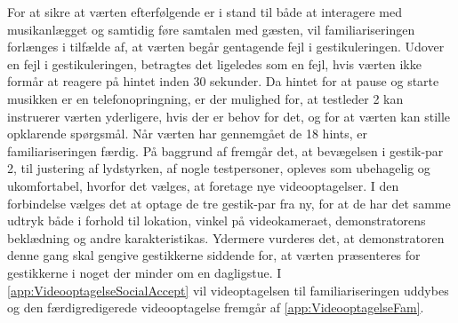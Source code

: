 For at sikre at værten efterfølgende er i stand til både at interagere med musikanlægget og samtidig føre samtalen med gæsten, vil familiariseringen forlænges i tilfælde af, at værten begår gentagende fejl i gestikuleringen. Udover en fejl i gestikuleringen, betragtes det ligeledes som en fejl, hvis værten ikke formår at reagere på hintet inden 30 sekunder. Da hintet for at pause og starte musikken er en telefonopringning, er der mulighed for, at testleder 2 kan instruerer værten yderligere, hvis der er behov for det, og for at værten kan stille opklarende spørgsmål. Når værten har gennemgået de 18 hints, er familiariseringen færdig.\blankline
%
På baggrund af  fremgår det, at bevægelsen i gestik-par 2, til justering af lydstyrken, af nogle testpersoner, opleves som ubehagelig og ukomfortabel, hvorfor det vælges, at foretage nye videooptagelser. I den forbindelse vælges det at optage de tre gestik-par fra ny, for at de har det samme udtryk både i forhold til lokation, vinkel på videokameraet, demonstratorens beklædning og andre karakteristikas. Ydermere vurderes det, at demonstratoren denne gang skal gengive gestikkerne siddende for, at værten præsenteres for gestikkerne i noget der minder om en dagligstue. I \autoref{app:VideooptagelseSocialAccept} vil videoptagelsen til familiariseringen uddybes og den færdigredigerede videooptagelse fremgår af \autoref{app:VideooptagelseFam}.

